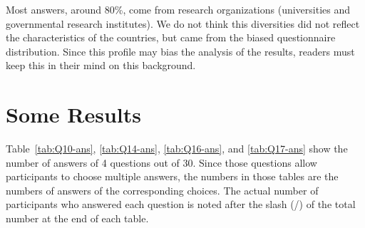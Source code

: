 \documentclass[sigconf,nonacm]{acmart}
\begin{document}
Most answers, around 80\%, come from research organizations
(universities and governmental research institutes).  We do not think this
diversities did not reflect the characteristics of the countries, but
came from the biased questionnaire distribution. 
Since this profile may bias the analysis of the results, 
readers must keep this in their mind on this background.

\section{Some Results}

Table~\ref{tab:Q10-ans}, \ref{tab:Q14-ans}, \ref{tab:Q16-ans}, and
\ref{tab:Q17-ans} show the number of answers of 4 questions out of
30. Since those questions allow participants to choose multiple answers, 
the numbers in those tables are the numbers of answers of the
corresponding choices. The actual number of participants who answered
each question is noted after the slash (/) of the total number
at the end of each table.  
\end{document}
